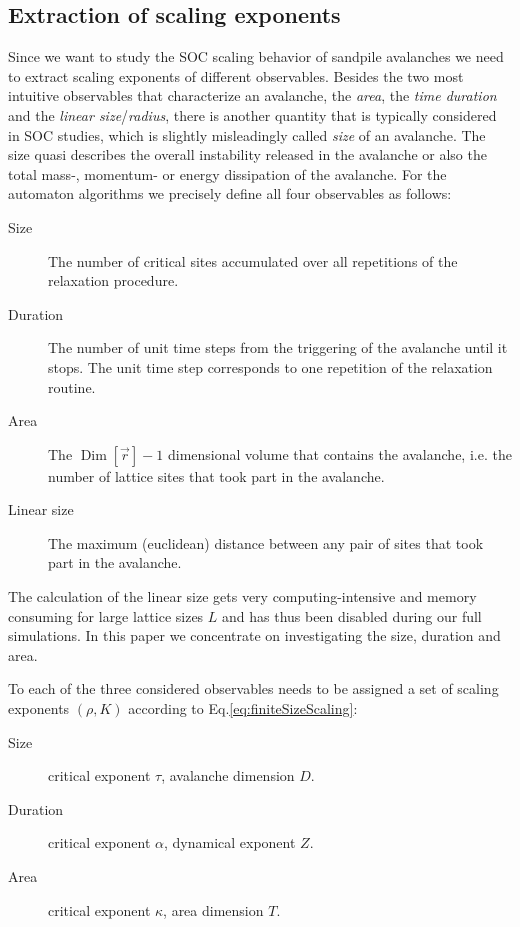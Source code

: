 \subsection{Extraction of scaling exponents}
\label{sec:extractCritExp}
Since we want to study the SOC scaling behavior of sandpile avalanches we need to extract scaling exponents of
different observables. Besides the two most intuitive observables that characterize an avalanche, the \emph{area},
the \emph{time duration} and the \emph{linear size}/\emph{radius}, there is another quantity that is typically considered
in SOC studies, which is slightly misleadingly called \emph{size} of an avalanche. The size quasi describes the overall
instability released in the avalanche or also the total mass-, momentum- or energy dissipation of the avalanche.
For the automaton algorithms we precisely define all four observables as follows:
\begin{description}
\item[Size] The number of critical sites accumulated over all repetitions of the relaxation procedure.
\item[Duration] The number of unit time steps from the triggering of the avalanche until it stops. The unit time step
                corresponds to one repetition of the relaxation routine.
\item[Area] The $\operatorname{Dim}\left[\vec{r}\right]-1$ dimensional volume that contains the avalanche,
            i.e. the number of lattice sites that took part in the avalanche.
\item[Linear size] The maximum (euclidean) distance between any pair of sites that took part in the avalanche.
\end{description}
The calculation of the linear size gets very computing-intensive and memory consuming for large
lattice sizes $L$ and has thus been disabled during our full simulations. In this paper we concentrate
on investigating the size, duration and area.

To each of the three considered observables needs to be assigned a set of scaling exponents $(\rho,K)$
according to Eq.\eqref{eq:finiteSizeScaling}:
\begin{description}
\item[Size] critical exponent $\tau$, avalanche dimension $D$.
\item[Duration] critical exponent $\alpha$, dynamical exponent $Z$.
\item[Area] critical exponent $\kappa$, area dimension $T$.
\end{description}

